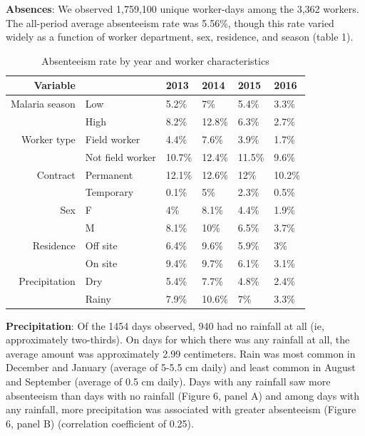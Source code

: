 \documentclass[]{article}
\begin{document}
\textbf{Absences}: We observed 1,759,100 unique worker-days among the
3,362 workers. The all-period average absenteeism rate was 5.56\%,
though this rate varied widely as a function of worker department, sex,
residence, and season (table 1).

\begin{table}[ht]
\centering
\begin{tabular}{rlllll}
  \hline
Variable &  & 2013 & 2014 & 2015 & 2016 \\ 
  \hline
Malaria season & Low & 5.2\% & 7\% & 5.4\% & 3.3\% \\ 
   & High & 8.2\% & 12.8\% & 6.3\% & 2.7\% \\ 
  Worker type & Field worker & 4.4\% & 7.6\% & 3.9\% & 1.7\% \\ 
   & Not field worker & 10.7\% & 12.4\% & 11.5\% & 9.6\% \\ 
  Contract & Permanent & 12.1\% & 12.6\% & 12\% & 10.2\% \\ 
   & Temporary & 0.1\% & 5\% & 2.3\% & 0.5\% \\ 
  Sex & F & 4\% & 8.1\% & 4.4\% & 1.9\% \\ 
   & M & 8.1\% & 10\% & 6.5\% & 3.7\% \\ 
  Residence & Off site & 6.4\% & 9.6\% & 5.9\% & 3\% \\ 
   & On site & 9.4\% & 9.7\% & 6.1\% & 3.1\% \\ 
  Precipitation & Dry & 5.4\% & 7.7\% & 4.8\% & 2.4\% \\ 
   & Rainy & 7.9\% & 10.6\% & 7\% & 3.3\% \\ 
   \hline
\end{tabular}
\caption{Absenteeism rate by year and worker characteristics} 
\end{table}

\textbf{Precipitation}: Of the 1454 days observed, 940 had no rainfall
at all (ie, approximately two-thirds). On days for which there was any
rainfall at all, the average amount was approximately 2.99 centimeters.
Rain was most common in December and January (average of 5-5.5 cm daily)
and least common in August and September (average of 0.5 cm daily). Days
with any rainfall saw more absenteeism than days with no rainfall
(Figure 6, panel A) and among days with any rainfall, more precipitation
was associated with greater absenteeism (Figure 6, panel B) (correlation
coefficient of 0.25).
\end{document}
